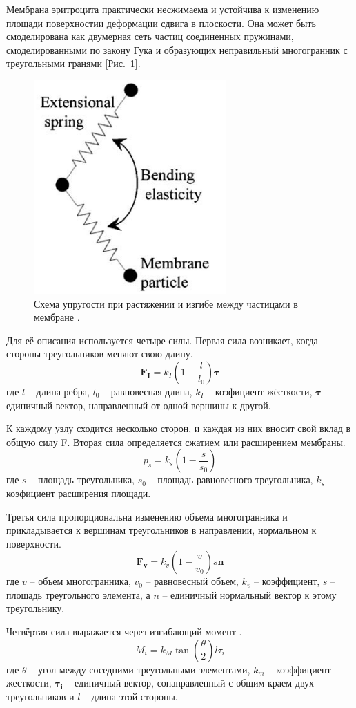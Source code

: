 Мембрана эритроцита практически несжимаема и устойчива к изменению площади поверхностии деформации сдвига в плоскости. Она может быть смоделирована как двумерная сеть частиц соединенных пружинами, смоделированными по закону Гука и образующих неправильный многогранник с треугольными гранями [Рис.~\ref{elasticity scheme}].

\begin{figure}[h]
\centering
\includegraphics[width=0.3\linewidth]{mol3.png}
\caption{ Схема упругости при растяжении и изгибе между частицами в мембране \cite{hosseini:2009}.}
\label{elasticity scheme}
\end{figure}

Для её описания используется четыре силы.
Первая сила возникает, когда стороны треугольников меняют свою длину.
$$
\mathbf {F_I}=k_I\left(1- \frac{l}{l_0}\right)\mathbf\tau
$$
где $l$ -- длина ребра, $l_0$ -- равновесная длина, $k_I$ -- коэфициент жёсткости, $\mathbf {\tau}$ -- единичный вектор, направленный от одной вершины к другой.

К каждому узлу сходится несколько сторон, и каждая из них вносит свой вклад в общую силу F. Вторая сила определяется сжатием или расширением мембраны.  
$$
{p_s}=k_s\left(1- \frac{s}{s_0}\right)
$$
где $s$ -- площадь треугольника, $s_0$ -- площадь равновесного треугольника, $k_s$ -- коэфициент расширения площади.

Третья сила пропорциональна изменению объема многогранника и прикладывается к вершинам треугольников в направлении, нормальном к поверхности. 
$$
\mathbf{F_v}=k_v\left(1- \frac{v}{v_0}\right) s \mathbf{n}
$$
где $v$ -- объем многогранника, $v_0$ -- равновесный объем, $k_v$ -- коэффициент, $s$ -- площадь
треугольного элемента, а $n$ -- единичный нормальный вектор к этому треугольнику.

Четвёртая сила выражается через изгибающий момент \cite{hosseini:2009}.
$$
 {M_i}=k_M \tan\left(\frac{\theta}{2}\right)l {\tau_i}
$$
где $\theta$ -- угол между соседними треугольными элементами, $k_m$ -- коэффициент жесткости, $\mathbf{\tau_i}$ -- единичный вектор, сонаправленный с общим краем двух треугольников и $l$ -- длина этой стороны.

